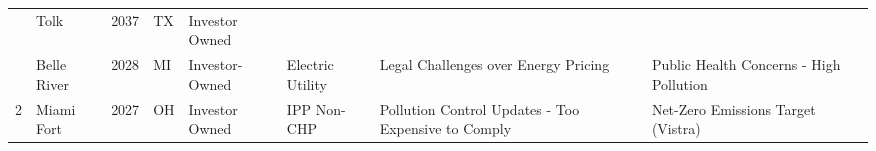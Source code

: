 \begin{table}[htb]
\begin{minipage}{1\textwidth}
\begin{adjustbox}{width=\textwidth}
\begin{small}
\begin{tabular}{cllllllll}
                  & Tolk & 2037 & TX & Investor Owned &  \\
                  & Belle River & 2028 & MI & Investor-Owned & Electric Utility & Legal Challenges over Energy Pricing & Public Health Concerns - High Pollution \\
                  \midrule
                  \multirow{1}{*}{2} & Miami Fort & 2027 & OH & Investor Owned & IPP Non-CHP & Pollution Control Updates - Too Expensive to Comply & Net-Zero Emissions Target (Vistra) \\
                  \midrule
              \end{tabular}
          \end{small}
      \end{adjustbox}
  \end{minipage}    

  \bigskip


\end{table}
